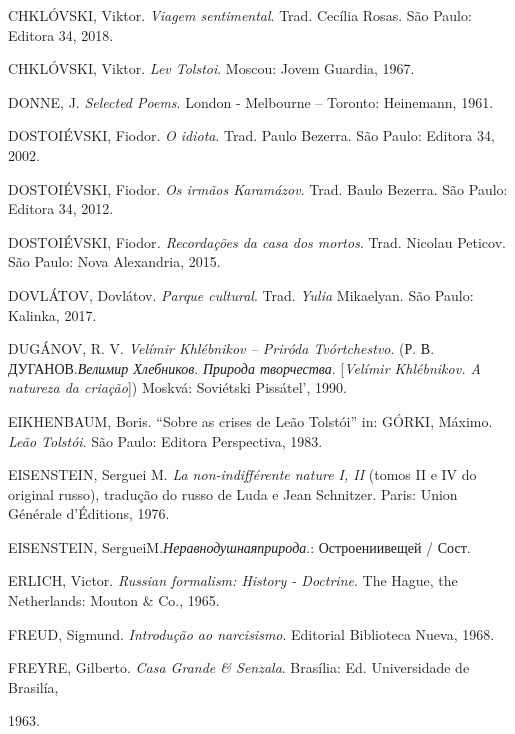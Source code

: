 CHKLÓVSKI, Viktor. \emph{Viagem sentimental}. Trad. Cecília Rosas. São
Paulo: Editora 34, 2018.

CHKLÓVSKI, Viktor. \emph{Lev Tolstoi}. Moscou: Jovem Guardia, 1967.

DONNE, J. \emph{Selected Poems}. London - Melbourne -- Toronto:
Heinemann, 1961.

DOSTOIÉVSKI, Fiodor. \emph{O idiota}. Trad. Paulo Bezerra. São Paulo:
Editora 34, 2002.

DOSTOIÉVSKI, Fiodor. \emph{Os irmãos Karamázov}. Trad. Baulo Bezerra.
São Paulo: Editora 34, 2012.

DOSTOIÉVSKI, Fiodor\emph{. Recordações da casa dos mortos}. Trad.
Nicolau Peticov. São Paulo: Nova Alexandria, 2015.

DOVLÁTOV, Dovlátov. \emph{Parque cultural}. Trad.
\emph{Yulia} Mikaelyan. São Paulo: Kalinka, 2017.

DUGÁNOV, R. V. \emph{Velímir Khlébnikov -- Priróda Tvórtchestvo}. (Р. В.
ДУГАНОВ.\emph{Велимир Хлебников}. \emph{Природа творчества}.
{[}\emph{Velímir Khlébnikov. A natureza da criação}{]}) Moskvá:
Soviétski Pissátel', 1990.

EIKHENBAUM, Boris. ``Sobre as crises de Leão Tolstói'' in: GÓRKI,
Máximo. \emph{Leão Tolstói}. São Paulo: Editora Perspectiva, 1983.

EISENSTEIN, Serguei M. \emph{La non-indifférente nature I, II} (tomos II
e IV do original russo), tradução do russo de Luda e Jean Schnitzer.
Paris: Union Générale d'Éditions, 1976.

EISENSTEIN, SergueiM.\emph{Неравнодушнаяприрода}.: Остроениивещей /
Сост.

ERLICH, Victor. \emph{Russian formalism: History - Doctrine}. The Hague,
the Netherlands: Mouton \& Co., 1965.

FREUD, Sigmund. \emph{Introdução ao narcisismo}. Editorial Biblioteca
Nueva, 1968.

FREYRE, Gilberto. \emph{Casa Grande \& Senzala}. Brasília: Ed.
Universidade de Brasilía,

1963.


